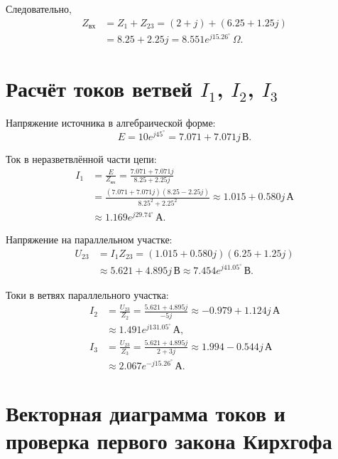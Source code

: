 \documentclass[12pt,a4paper]{article}
\newcommand{\Ohm}{\,\Omega}
\newcommand{\Volt}{\,\text{В}}
\newcommand{\Amp}{\,\text{А}}
\begin{document}
Следовательно,
\begin{equation*}
\begin{aligned}
Z_{\text{вх}} &= Z_1 + Z_{23} = (2+j) + (6.25 + 1.25j) \\
&= 8.25 + 2.25j
= 8.551e^{j15.26^\circ}\Ohm.
\end{aligned}
\end{equation*}

\section{Расчёт токов ветвей $I_1$, $I_2$, $I_3$}

Напряжение источника в алгебраической форме:
\[
E = 10e^{j45^\circ} = 7.071 + 7.071j\Volt.
\]

Ток в неразветвлённой части цепи:
\begin{equation*}
\begin{aligned}
I_1 &= \frac{E}{Z_{\text{вх}}}
= \frac{7.071 + 7.071j}{8.25 + 2.25j} \\
&= \frac{(7.071 + 7.071j)(8.25 - 2.25j)}{8.25^2 + 2.25^2}
\approx 1.015 + 0.580j\Amp \\
&\approx 1.169e^{j29.74^\circ}\Amp.
\end{aligned}
\end{equation*}

Напряжение на параллельном участке:
\begin{equation*}
\begin{aligned}
U_{23} &= I_1 Z_{23} = (1.015 + 0.580j)(6.25 + 1.25j) \\
&\approx 5.621 + 4.895j\Volt
\approx 7.454e^{j41.05^\circ}\Volt.
\end{aligned}
\end{equation*}

Токи в ветвях параллельного участка:
\begin{equation*}
\begin{aligned}
I_2 &= \frac{U_{23}}{Z_2}
= \frac{5.621 + 4.895j}{-5j}
\approx -0.979 + 1.124j\Amp \\
&\approx 1.491e^{j131.05^\circ}\Amp,\\[0.75em]
I_3 &= \frac{U_{23}}{Z_3}
= \frac{5.621 + 4.895j}{2 + 3j}
\approx 1.994 - 0.544j\Amp \\
&\approx 2.067e^{-j15.26^\circ}\Amp.
\end{aligned}
\end{equation*}

\section{Векторная диаграмма токов и проверка первого закона Кирхгофа}
\end{document}
